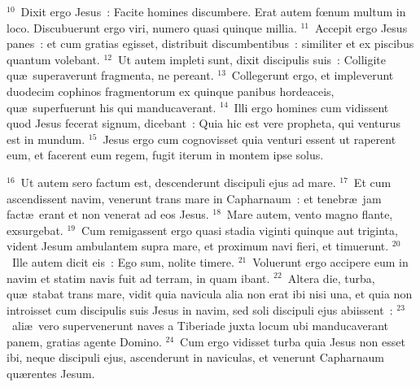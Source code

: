 ${}^{10}$~Dixit ergo Jesus~: Facite homines discumbere. Erat autem fœnum multum in loco. Discubuerunt ergo viri, numero quasi quinque millia.
${}^{11}$~Accepit ergo Jesus panes~: et cum gratias egisset, distribuit discumbentibus~: similiter et ex piscibus quantum volebant.
${}^{12}$~Ut autem impleti sunt, dixit discipulis suis~: Colligite qu\ae\ superaverunt fragmenta, ne pereant.
${}^{13}$~Collegerunt ergo, et impleverunt duodecim cophinos fragmentorum ex quinque panibus hordeaceis, qu\ae\ superfuerunt his qui manducaverant.
${}^{14}$~Illi ergo homines cum vidissent quod Jesus fecerat signum, dicebant~: Quia hic est vere propheta, qui venturus est in mundum.
${}^{15}$~Jesus ergo cum cognovisset quia venturi essent ut raperent eum, et facerent eum regem, fugit iterum in montem ipse solus.


${}^{16}$~Ut autem sero factum est, descenderunt discipuli ejus ad mare.
${}^{17}$~Et cum ascendissent navim, venerunt trans mare in Capharnaum~: et tenebr\ae\ jam fact\ae\ erant et non venerat ad eos Jesus.
${}^{18}$~Mare autem, vento magno flante, exsurgebat.
${}^{19}$~Cum remigassent ergo quasi stadia viginti quinque aut triginta, vident Jesum ambulantem supra mare, et proximum navi fieri, et timuerunt.
${}^{20}$~Ille autem dicit eis~: Ego sum, nolite timere.
${}^{21}$~Voluerunt ergo accipere eum in navim et statim navis fuit ad terram, in quam ibant.
${}^{22}$~Altera die, turba, qu\ae\ stabat trans mare, vidit quia navicula alia non erat ibi nisi una, et quia non introisset cum discipulis suis Jesus in navim, sed soli discipuli ejus abiissent~:
${}^{23}$~ali\ae\ vero supervenerunt naves a Tiberiade juxta locum ubi manducaverant panem, gratias agente Domino.
${}^{24}$~Cum ergo vidisset turba quia Jesus non esset ibi, neque discipuli ejus, ascenderunt in naviculas, et venerunt Capharnaum qu\ae rentes Jesum.


